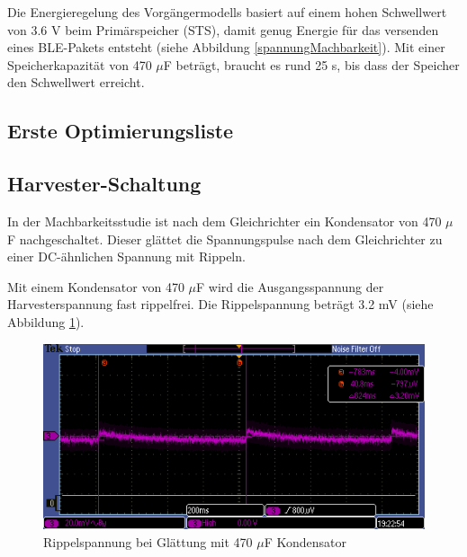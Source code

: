 Die Energieregelung des Vorgängermodells basiert auf einem hohen Schwellwert von 3.6 V beim Primärspeicher (STS), damit genug Energie für das versenden eines BLE-Pakets entsteht (siehe Abbildung \ref{spannungMachbarkeit}). Mit einer Speicherkapazität von 470 $\mu$F beträgt, braucht es rund 25 s, bis dass der Speicher den Schwellwert erreicht.  


\subsection{Erste Optimierungsliste}

%
%
%     
%



\subsection{Harvester-Schaltung}

In der Machbarkeitsstudie ist nach dem Gleichrichter ein Kondensator von 470 $\mu$F nachgeschaltet. Dieser glättet die Spannungspulse nach dem Gleichrichter zu einer DC-ähnlichen Spannung mit Rippeln.

Mit einem Kondensator von 470 $\mu$F wird die Ausgangsspannung der Harvesterspannung fast rippelfrei. Die Rippelspannung beträgt 3.2 mV (siehe Abbildung \ref{kond470uF}).

\begin{figure}
    \includegraphics[width=15cm]{3Vorgehen/imag/470uF.PNG}
    \caption{Rippelspannung bei Glättung mit 470 $\mu$F Kondensator}\label{kond470uF} 
\end{figure}

